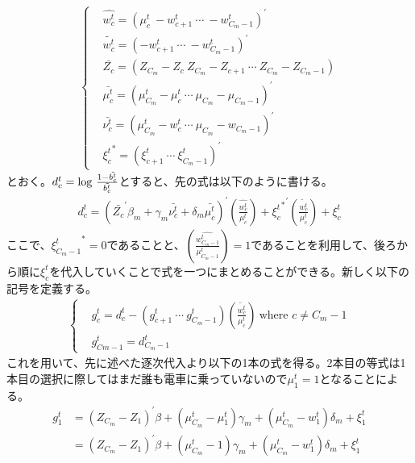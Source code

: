 \documentclass{jsarticle}
\begin{document}
\begin{align*}
	\begin{cases}
	&\hat{w_c^t} = \left( \mu_c^t\  -w_{c+1}^t\  \cdots\  -w_{C_m-1}^t\right)^{'}\\[8pt]
	&\tilde{w_c^t} =  \left( -w_{c+1}^t\  \cdots\  -w_{C_m-1}^t\right)^{'}\\[8pt]
	&\bar{Z_c} = \left(Z_{C_m} - Z_c\ Z_{C_m} - Z_{c+1}\ \cdots\ Z_{C_m} - Z_{C_m - 1}\right)\\[8pt]
	&\bar{\mu_c^t} = \left( \mu_{C_m}^t - \mu_c^t\ \cdots\ \mu_{C_m} - \mu_{C_m-1} \right)^{'}\\[8pt]
	&\bar{\nu_c^t} = \left( \mu_{C_m}^t - w_c^t\ \cdots\ \mu_{C_m} - w_{C_m-1} \right)^{'}\\[8pt]
	&{\xi_c^t}^{*} = \left( \xi_{c+1}^t\ \cdots\ \xi_{C_m-1}^t \right)^{'}
	\end{cases}
\end{align*}
とおく。$d_c^t = {\rm log}\ \frac{1 - \tilde{{b_c^t}}}{\tilde{b_c^t}}$とすると、先の式は以下のように書ける。
\begin{align}
	d_c^t = \left( \bar{Z_c}^{'}\beta_m + \gamma_m \bar{\nu_c^t} + \delta_m \bar{\mu_c^t} \right)^{'} \left( \frac{\hat{w_c^t}}{\mu_c^t} \right) + {{\xi_c^t}^{*}}^{'} \left( \frac{\tilde{w_c^t}}{\mu_c^t} \right) + \xi_c^t
\end{align}
ここで、${\xi_{C_m-1}^t}^{*} = 0$であることと、$\left( \frac{\hat{w_{C_m-1}^t}}{\mu_{C_m-1}^t} \right) = 1$であることを利用して、後ろから順に$\xi_c^t$を代入していくことで式を一つにまとめることができる。新しく以下の記号を定義する。
\begin{align*}
\begin{cases}
	&g_c^t = d_c^t - \left( g_{c+1}^t\ \cdots\ g_{C_m-1}^t\right) \left( \frac{\tilde{w_c^t}}{\mu_c^t} \right)\ \text{where $c \neq C_m -1$}\\[8pt]
	&g_{Cm-1}^t = d_{C_m-1}^t
\end{cases}
\end{align*}
これを用いて、先に述べた逐次代入より以下の1本の式を得る。2本目の等式は1本目の選択に際してはまだ誰も電車に乗っていないので$\mu_1^t = 1$となることによる。
\begin{align*}
	g_1^t &= (Z_{C_m} - Z_1)^{'} \beta + (\mu_{C_m}^t - \mu_1^t)\gamma_m + (\mu_{C_m}^t - w_1^t)\delta_m + \xi_1^t\\[8pt]
	&= (Z_{C_m} - Z_1)^{'} \beta + \left(\mu_{C_m}^t-1\right)\gamma_m + (\mu_{C_m}^t - w_1^t)\delta_m + \xi_1^t
\end{align*}
\end{document}
